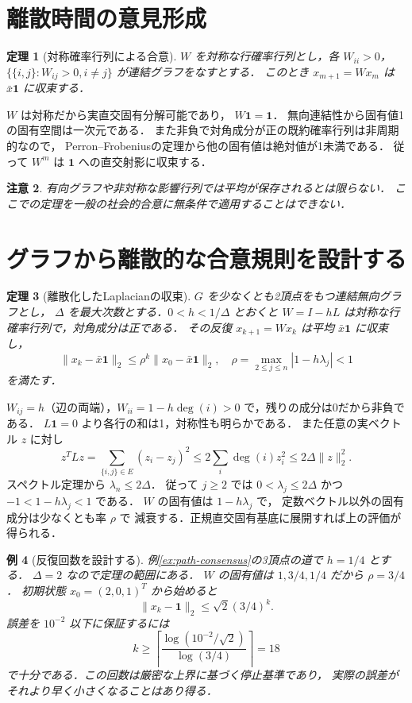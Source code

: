 \documentclass[a5paper,10pt,onecolumn]{jsarticle}
\makeatletter
\theoremstyle{mathnotetheorem}
\newtheorem{theorem}{定理}[section]
\newtheorem{example}[theorem]{例}
\newtheorem{remark}[theorem]{注意}
\renewcommand{\proofname}{証明}
\renewenvironment{proof}[1][\proofname]{%
  \par\pushQED{\qed}\normalfont\topsep4\p@\@plus2\p@\relax
  \trivlist\item[\hskip\labelsep\bfseries #1]\ignorespaces
}{\popQED\endtrivlist\@endpefalse}
\makeatother
\begin{document}
\section{離散時間の意見形成}
\begin{theorem}[対称確率行列による合意]
$W$ を対称な行確率行列とし，各 $W_{ii}>0$，
$\{\{i,j\}:W_{ij}>0,i\ne j\}$ が連結グラフをなすとする．
このとき $x_{m+1}=Wx_m$ は
$\bar x\mathbf1$ に収束する．
\end{theorem}
\begin{proof}
$W$ は対称だから実直交固有分解可能であり，
$W\mathbf1=\mathbf1$．
無向連結性から固有値1の固有空間は一次元である．
また非負で対角成分が正の既約確率行列は非周期的なので，
Perron--Frobeniusの定理から他の固有値は絶対値が1未満である．
従って $W^m$ は $\mathbf1$ への直交射影に収束する．
\end{proof}
\begin{remark}
有向グラフや非対称な影響行列では平均が保存されるとは限らない．
ここでの定理を一般の社会的合意に無条件で適用することはできない．
\end{remark}



\section{グラフから離散的な合意規則を設計する}
\begin{theorem}[離散化したLaplacianの収束]\label{thm:weighted-consensus}
$G$ を少なくとも2頂点をもつ連結無向グラフとし，
$\Delta$ を最大次数とする．$0<h<1/\Delta$ とおくと
$W=I-hL$ は対称な行確率行列で，対角成分は正である．
その反復 $x_{k+1}=Wx_k$ は平均 $\bar x\mathbf1$ に収束し，
\[
 \|x_k-\bar x\mathbf1\|_2
 \le\rho^k\|x_0-\bar x\mathbf1\|_2,\quad
 \rho=\max_{2\le j\le n}|1-h\lambda_j|<1
\]
を満たす．
\end{theorem}
\begin{proof}
$W_{ij}=h$（辺の両端），$W_{ii}=1-h\deg(i)>0$
で，残りの成分は0だから非負である．
$L\mathbf1=0$ より各行の和は1，対称性も明らかである．
また任意の実ベクトル $z$ に対し
\[
 z^TLz=\sum_{\{i,j\}\in E}(z_i-z_j)^2
 \le2\sum_i\deg(i)z_i^2
 \le2\Delta\|z\|_2^2.
\]
スペクトル定理から $\lambda_n\le2\Delta$．
従って $j\ge2$ では
$0<\lambda_j\le2\Delta$ かつ
$-1<1-h\lambda_j<1$ である．
$W$ の固有値は $1-h\lambda_j$ で，
定数ベクトル以外の固有成分は少なくとも率 $\rho$ で
減衰する．正規直交固有基底に展開すれば上の評価が得られる．
\end{proof}
\begin{example}[反復回数を設計する]
例\ref{ex:path-consensus}の3頂点の道で $h=1/4$ とする．
$\Delta=2$ なので定理の範囲にある．
$W$ の固有値は $1,3/4,1/4$ だから $\rho=3/4$．
初期状態 $x_0=(2,0,1)^T$ から始めると
\[
 \|x_k-\mathbf1\|_2\le\sqrt2(3/4)^k.
\]
誤差を $10^{-2}$ 以下に保証するには
\[
 k\ge
 \left\lceil\frac{\log(10^{-2}/\sqrt2)}{\log(3/4)}\right\rceil
 =18
\]
で十分である．この回数は厳密な上界に基づく停止基準であり，
実際の誤差がそれより早く小さくなることはあり得る．
\end{example}
\end{document}
